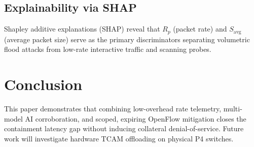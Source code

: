 \documentclass[conference]{IEEEtran}
\begin{document}
\subsection{Explainability via SHAP}
Shapley additive explanations (SHAP) reveal that $R_p$ (packet rate) and $S_{\text{avg}}$ (average packet size) serve as the primary discriminators separating volumetric flood attacks from low-rate interactive traffic and scanning probes.

\section{Conclusion}
This paper demonstrates that combining low-overhead rate telemetry, multi-model AI corroboration, and scoped, expiring OpenFlow mitigation closes the containment latency gap without inducing collateral denial-of-service. Future work will investigate hardware TCAM offloading on physical P4 switches.



\end{document}
